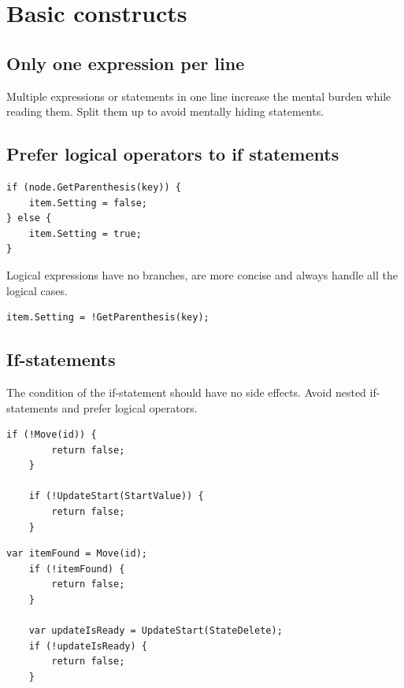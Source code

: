 \documentclass[11pt,a4paper]{article}
\begin{document}
\section{Basic constructs}

\subsection {Only one expression per line}

Multiple expressions or statements in one line increase the mental burden while reading them. Split them up to avoid mentally hiding statements.

\subsection{Prefer logical operators to if statements}

\begin{lstlisting}[language={[Sharp]C}, caption={Avoid if and ternary operator for logical expressions}]
if (node.GetParenthesis(key)) {
    item.Setting = false;
} else {
    item.Setting = true;
}
\end{lstlisting}

Logical expressions have no branches, are more concise and always handle all the logical cases.

\begin{lstlisting}[language={[Sharp]C}, caption={Use logical operators !, \&\& and ||}]
item.Setting = !GetParenthesis(key);
\end{lstlisting}


\subsection{If-statements}

The condition of the if-statement should have no side effects.
Avoid nested if-statements and prefer logical operators.

\begin{lstlisting}[language={[Sharp]C}, caption={Avoid side-effects}]
    if (!Move(id)) {
        return false;
    }

    if (!UpdateStart(StartValue)) {
        return false;
    }
\end{lstlisting}

\begin{lstlisting}[language={[Sharp]C}, caption={Better alternative}]
    var itemFound = Move(id);
    if (!itemFound) {
        return false;
    }

    var updateIsReady = UpdateStart(StateDelete);
    if (!updateIsReady) {
        return false;
    }
\end{lstlisting}
\end{document}
